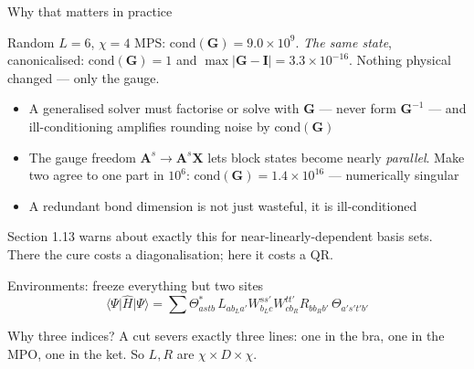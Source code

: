 \documentclass[aspectratio=169,10pt]{beamer}
\newcommand{\numbox}[1]{%
  \begin{tcolorbox}[colback=palegreen,colframe=teal!70!black,title={\bfseries Measured}]
  #1
  \end{tcolorbox}}
\newcommand{\element}[3]{\langle #1\vert #2\vert #3\rangle}
\newcommand{\bmat}[1]{\bm{#1}}
\newcommand{\Amat}[1]{\bm{A}^{#1}}
\newcommand{\hH}{\hat{H}}
\begin{document}
\begin{frame}{Why that matters in practice}
  \numbox{Random $L=6$, $\chi=4$ MPS: $\mathrm{cond}(\bmat G)=9.0\times10^{9}$. \emph{The same state}, canonicalised:
  $\mathrm{cond}(\bmat G)=1$ and $\max|\bmat G-\bmat I|=3.3\times10^{-16}$. Nothing physical changed --- only the gauge.}
  \begin{itemize}
    \item A generalised solver must factorise or solve with $\bmat G$ --- \alert{never form $\bmat G^{-1}$} --- and
          ill-conditioning amplifies rounding noise by $\mathrm{cond}(\bmat G)$
    \item The gauge freedom $\Amat s\to\Amat s\bmat X$ lets block states become nearly \emph{parallel}. Make two agree to one part in $10^6$: $\mathrm{cond}(\bmat G)=1.4\times10^{16}$ --- numerically singular
    \item \alert{A redundant bond dimension is not just wasteful, it is ill-conditioned}
  \end{itemize}
  \vspace{0.3em}
  \centering\small Section 1.13 warns about exactly this for near-linearly-dependent basis sets.
  There the cure costs a diagonalisation; here it costs a QR.
\end{frame}

\begin{frame}{Environments: freeze everything but two sites}
  \[
    \element{\Psi}{\hH}{\Psi}=\sum\Theta^*_{astb}\,L_{a b_L a'}W^{ss'}_{b_Lc}W^{tt'}_{c b_R}R_{b b_R b'}\,\Theta_{a's't'b'}
  \]
  \begin{center}
  \end{center}
  \centering\small
  \alert{Why three indices?} A cut severs exactly three lines: one in the bra, one in the MPO, one in the ket. So $L,R$ are $\chi\times D\times\chi$.
\end{frame}
\end{document}
